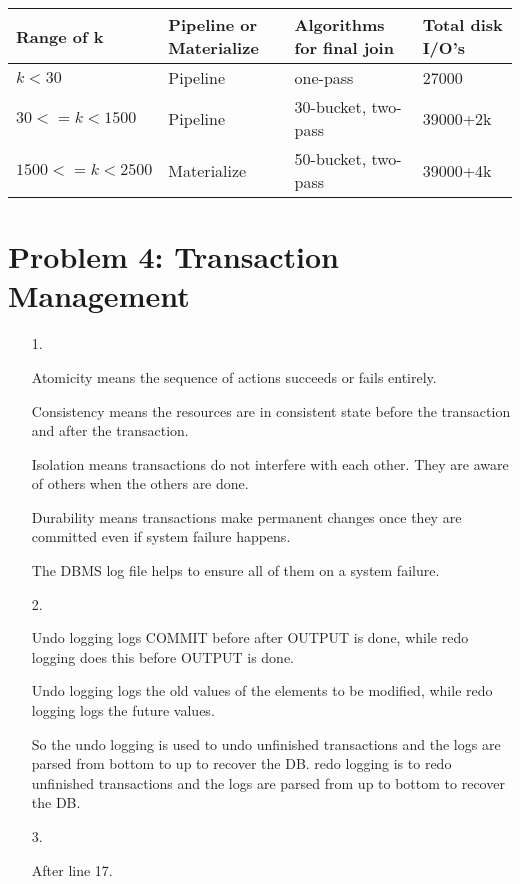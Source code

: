 \documentclass[letter,11pt]{article}
\begin{document}
\begin{tabular}{|l | l | l | l |}
  \hline
  Range of k            & Pipeline or Materialize & Algorithms for final join & Total disk I/O's\\
  \hline
  $k < 30$                & Pipeline                & one-pass                    & 27000\\
  \hline
  $30 <= k < 1500$        & Pipeline                & 30-bucket, two-pass         & 39000+2k\\
  \hline
  $1500 <= k < 2500$      & Materialize             & 50-bucket, two-pass         & 39000+4k\\
  \hline
  
\end{tabular}

\section*{Problem 4: Transaction Management}

\begin{enumerate}

\item[1.]

Atomicity means the sequence of actions succeeds or fails entirely.

Consistency means the resources are in consistent state before the transaction and after the transaction.

Isolation means transactions do not interfere with each other. They are aware of others when the others are done.

Durability means transactions make permanent changes once they are committed even if system failure happens.

The DBMS log file helps to ensure all of them on a system failure.

\item[2.]

Undo logging logs COMMIT before after OUTPUT is done, while redo logging does this before OUTPUT is done.

Undo logging logs the old values of the elements to be modified, while redo logging logs the future values.

So the undo logging is used to undo unfinished transactions and the logs are parsed from bottom to up to recover the DB. redo logging is to redo unfinished transactions and the logs are parsed from up to bottom to recover the DB.


\item[3.]

After line 17.

\end{enumerate}
\end{document}
